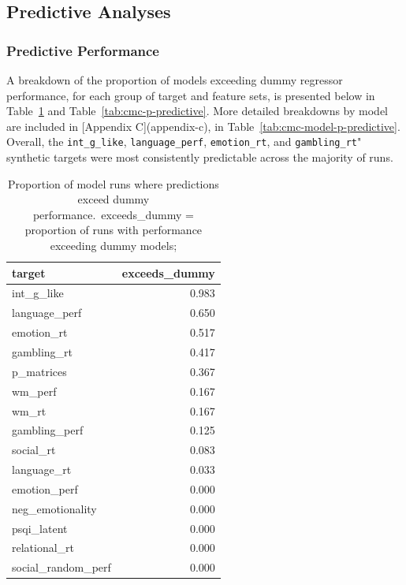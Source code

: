 \documentclass{article}
\begin{document}
\subsection{Predictive Analyses}

\subsubsection{Predictive Performance}

A breakdown of the proportion of models exceeding dummy regressor
performance, for each group of target and feature sets, is presented below in
Table~\ref{tab:cmc-p-target-predictive} and Table~\ref{tab:cmc-p-predictive}.
More detailed breakdowns by model are included in [Appendix C](appendix-c),
in Table~\ref{tab:cmc-model-p-predictive}. Overall, the
\texttt{int\_g\_like}, \texttt{language\_perf}, \texttt{emotion\_rt}, and
\texttt{gambling\_rt}" synthetic targets were most consistently predictable
across the majority of runs.


\begin{table}
\centering
\begin{tabular}{lr}
	\toprule
	target & exceeds\_dummy \\
	\midrule
	int\_g\_like & 0.983 \\
	language\_perf & 0.650 \\
	emotion\_rt & 0.517 \\
	gambling\_rt & 0.417 \\
	p\_matrices & 0.367 \\
	wm\_perf & 0.167 \\
	wm\_rt & 0.167 \\
	gambling\_perf & 0.125 \\
	social\_rt & 0.083 \\
	language\_rt & 0.033 \\
	emotion\_perf & 0.000 \\
	neg\_emotionality & 0.000 \\
	psqi\_latent & 0.000 \\
	relational\_rt & 0.000 \\
	social\_random\_perf & 0.000 \\
	\bottomrule
\end{tabular}
\footnotesize
\caption{Proportion of model runs where predictions exceed dummy performance.\
exceeds\_dummy = proportion of runs with performance exceeding dummy models;}
\normalsize
\label{tab:cmc-p-target-predictive}
\end{table}
\end{document}
